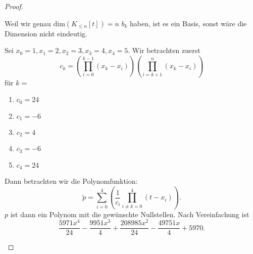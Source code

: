 \begin{proof}
\begin{parts}
	Weil wir genau $\text{dim}(K_{\le n}[t])=n$ $b_k$ haben, ist es ein Basis, sonst wäre die Dimension nicht eindeutig.
\item Sei $x_0=1,x_1=2,x_2=3,x_3=4,x_4=5$. Wir betrachten zuerst
	\[
c_k=\left(	\prod_{i=0}^{k-1} (x_k-x_i)\right)\left( \prod_{i=k+1}^{n} (x_k-x_i)  \right)  
\]
f\"{u}r $k=$ 
\begin{enumerate}[label=(\arabic*),start=0]
	\item $c_0=24$
	\item $c_1=-6$
	\item $c_2=4$
	\item $c_3=-6$
	\item $c_4=24$
\end{enumerate}
Dann betrachten wir die Polynomfunktion:
\[
	\tilde{p}=\sum_{i=0}^4\left( \frac{1}{c_i}\prod_{i\neq k = 0}^4 (t-x_i)  \right) 
.\] 
$p$ ist dann ein Polynom mit die gewünschte Nullstellen. Nach Vereinfachung ist
\[
\frac{5971 x^4}{24}-\frac{9951 x^3}{4}+\frac{208985 x^2}{24}-\frac{49751 x}{4}+5970
.\] 
	\end{parts}
\end{proof}
